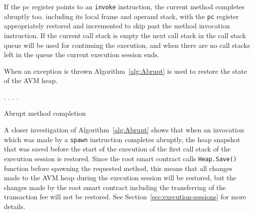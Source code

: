 If the pc register points to an \texttt{invoke} instruction, the current method completes abruptly too.
including its local frame and operand stack, with the \texttt{pc} register appropriately restored and incremented
to skip past the method invocation instruction. If the current call stack is empty the next call stack in the call
stack queue will be used for continuing the execution, and when there are no call stacks left in the queue the
current execution session ends.

When an exception is thrown
Algorithm~\ref{alg:Abrupt} is used to restore the state of the AVM heap.

\begin{algorithm}
    \DontPrintSemicolon

    {
        \Stack.\Pop{}\;
        {
            \Heap.\Restore{}\;
        }{
            \Heap.\Discard{}\;
        }
    }
    \Heap.\Restore{}\;
    \caption{Abrupt method completion}\label{alg:Abrupt}
\end{algorithm}

A closer investigation of Algorithm~\ref{alg:Abrupt} shows that when an invocation which was made by
a \texttt{spawn} instruction completes abruptly, the heap snapshot that was saved before the start of the
execution of the first call stack of the execution session is restored. Since the root
smart contract calls \texttt{Heap.Save()} function before spawning the requested method, this means
that all changes made to the AVM heap during the execution session will be restored, but the changes made by
the root smart contract including the transferring of the transaction fee will not be restored. See
Section~\ref{sec:execution-sessions} for more details.


